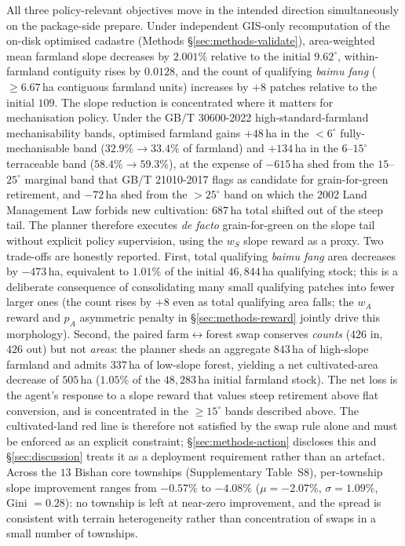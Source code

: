 \documentclass[11pt]{article}
\begin{document}
All three policy-relevant objectives move in the intended direction simultaneously on the package-side prepare. Under independent GIS-only recomputation of the on-disk optimised cadastre (Methods \S\ref{sec:methods-validate}), area-weighted mean farmland slope decreases by $2.001\%$ relative to the initial $9.62^{\circ}$, within-farmland contiguity rises by $0.0128$, and the count of qualifying \textit{baimu fang} ($\geq 6.67$\,ha contiguous farmland units) increases by $+8$ patches relative to the initial $109$. The slope reduction is concentrated where it matters for mechanisation policy. Under the GB/T 30600-2022 high-standard-farmland mechanisability bands, optimised farmland gains $+48$\,ha in the $<6^{\circ}$ fully-mechanisable band ($32.9\%\rightarrow33.4\%$ of farmland) and $+134$\,ha in the $6$--$15^{\circ}$ terraceable band ($58.4\%\rightarrow59.3\%$), at the expense of $-615$\,ha shed from the $15$--$25^{\circ}$ marginal band that GB/T 21010-2017 flags as candidate for grain-for-green retirement, and $-72$\,ha shed from the $>25^{\circ}$ band on which the 2002 Land Management Law forbids new cultivation: $687$\,ha total shifted out of the steep tail. The planner therefore executes \emph{de facto} grain-for-green on the slope tail without explicit policy supervision, using the $w_S$ slope reward as a proxy. Two trade-offs are honestly reported. First, total qualifying \textit{baimu fang} area decreases by $-473$\,ha, equivalent to $1.01\%$ of the initial $46{,}844$\,ha qualifying stock; this is a deliberate consequence of consolidating many small qualifying patches into fewer larger ones (the count rises by $+8$ even as total qualifying area falls; the $w_A$ reward and $p_A$ asymmetric penalty in \S\ref{sec:methods-reward} jointly drive this morphology). Second, the paired farm$\leftrightarrow$forest swap conserves \emph{counts} ($426$ in, $426$ out) but not \emph{areas}: the planner sheds an aggregate $843$\,ha of high-slope farmland and admits $337$\,ha of low-slope forest, yielding a net cultivated-area decrease of $505$\,ha ($1.05\%$ of the $48{,}283$\,ha initial farmland stock). The net loss is the agent's response to a slope reward that values steep retirement above flat conversion, and is concentrated in the $\geq 15^{\circ}$ bands described above. The cultivated-land red line is therefore not satisfied by the swap rule alone and must be enforced as an explicit constraint; \S\ref{sec:methods-action} discloses this and \S\ref{sec:discussion} treats it as a deployment requirement rather than an artefact. Across the $13$ Bishan core townships (Supplementary Table~S8), per-township slope improvement ranges from $-0.57\%$ to $-4.08\%$ ($\mu = -2.07\%$, $\sigma = 1.09\%$, Gini $= 0.28$): no township is left at near-zero improvement, and the spread is consistent with terrain heterogeneity rather than concentration of swaps in a small number of townships.
\end{document}
